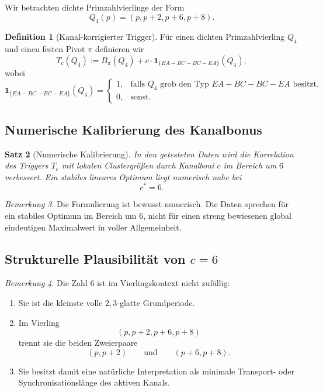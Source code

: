 \documentclass[11pt,a4paper]{article}
\theoremstyle{plain}
\newtheorem{satz}{Satz}[section]
\theoremstyle{definition}
\newtheorem{definition}[satz]{Definition}
\theoremstyle{remark}
\newtheorem{bemerkung}[satz]{Bemerkung}
\newcommand{\1}{\mathbf{1}}
\begin{document}
	Wir betrachten dichte Primzahlvierlinge der Form
	\[
	Q_4(p)=(p,p+2,p+6,p+8).
	\]
	
	\begin{definition}[Kanal-korrigierter Trigger]
		\label{def:trigger}
		Für einen dichten Primzahlvierling \(Q_4\) und einen festen Pivot \(\pi\) definieren wir
		\[
		T_c(Q_4):=B_\pi(Q_4)+c\cdot \mathbf{1}_{\{EA-BC-BC-EA\}}(Q_4),
		\]
		wobei
		\[
		\mathbf{1}_{\{EA-BC-BC-EA\}}(Q_4)=
		\begin{cases}
			1,&\text{falls }Q_4\text{ grob den Typ }EA-BC-BC-EA\text{ besitzt},\\
			0,&\text{sonst.}
		\end{cases}
		\]
	\end{definition}
	
	\subsection{Numerische Kalibrierung des Kanalbonus}
	
	\begin{satz}[Numerische Kalibrierung]
		\label{satz:kalibrierung}
		In den getesteten Daten wird die Korrelation des Triggers \(T_c\) mit lokalen Clustergrößen durch Kanalboni \(c\) im Bereich um \(6\) verbessert. Ein stabiles lineares Optimum liegt numerisch nahe bei
		\[
		c^*=6.
		\]
	\end{satz}
	
	\begin{bemerkung}
		Die Formulierung ist bewusst numerisch. Die Daten sprechen für ein stabiles Optimum im Bereich um \(6\), nicht für einen streng bewiesenen global eindeutigen Maximalwert in voller Allgemeinheit.
	\end{bemerkung}
	
	\subsection{Strukturelle Plausibilität von \(c=6\)}
	
	\begin{bemerkung}
		Die Zahl \(6\) ist im Vierlingskontext nicht zufällig:
		\begin{enumerate}[label=(\arabic*)]
			\item Sie ist die kleinste volle \(2,3\)-glatte Grundperiode.
			\item Im Vierling
			\[
			(p,p+2,p+6,p+8)
			\]
			trennt sie die beiden Zweierpaare
			\[
			(p,p+2)\qquad\text{und}\qquad (p+6,p+8).
			\]
			\item Sie besitzt damit eine natürliche Interpretation als minimale Transport- oder Synchronisationslänge des aktiven Kanals.
		\end{enumerate}
	\end{bemerkung}
	
\end{document}
